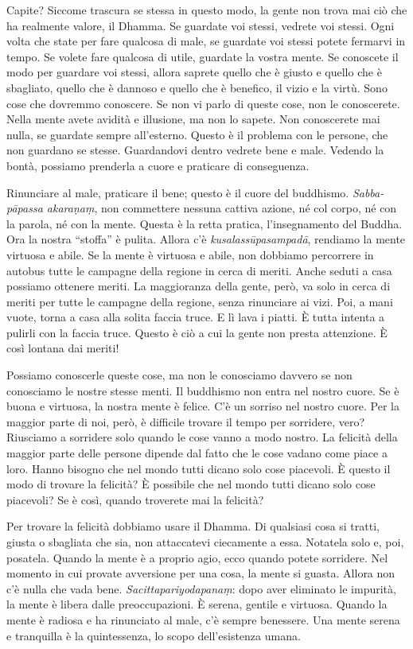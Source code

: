 Capite? Siccome trascura se stessa in questo modo, la gente non trova
mai ciò che ha realmente valore, il Dhamma. Se guardate voi stessi,
vedrete voi stessi. Ogni volta che state per fare qualcosa di male, se
guardate voi stessi potete fermarvi in tempo. Se volete fare qualcosa di
utile, guardate la vostra mente. Se conoscete il modo per guardare voi
stessi, allora saprete quello che è giusto e quello che è sbagliato,
quello che è dannoso e quello che è benefico, il vizio e la virtù. Sono
cose che dovremmo conoscere. Se non vi parlo di queste cose, non le
conoscerete. Nella mente avete avidità e illusione, ma non lo sapete.
Non conoscerete mai nulla, se guardate sempre all'esterno. Questo è il
problema con le persone, che non guardano se stesse. Guardandovi dentro
vedrete bene e male. Vedendo la bontà, possiamo prenderla a cuore e
praticare di conseguenza.

Rinunciare al male, praticare il bene; questo è il cuore del buddhismo.
\emph{Sabba-pāpassa akaraṇaṃ}, non commettere nessuna cattiva azione, né
col corpo, né con la parola, né con la mente. Questa è la retta pratica,
l'insegnamento del Buddha. Ora la nostra ``stoffa'' è pulita. Allora c'è
\emph{kusalassūpasampadā}, rendiamo la mente virtuosa e abile. Se la
mente è virtuosa e abile, non dobbiamo percorrere in autobus tutte le
campagne della regione in cerca di meriti. Anche seduti a casa possiamo
ottenere meriti. La maggioranza della gente, però, va solo in cerca di
meriti per tutte le campagne della regione, senza rinunciare ai vizi.
Poi, a mani vuote, torna a casa alla solita faccia truce. E lì lava i
piatti. È tutta intenta a pulirli con la faccia truce. Questo è ciò a
cui la gente non presta attenzione. È così lontana dai meriti!

Possiamo conoscerle queste cose, ma non le conosciamo davvero se non
conosciamo le nostre stesse menti. Il buddhismo non entra nel nostro
cuore. Se è buona e virtuosa, la nostra mente è felice. C'è un sorriso
nel nostro cuore. Per la maggior parte di noi, però, è difficile trovare
il tempo per sorridere, vero? Riusciamo a sorridere solo quando le cose
vanno a modo nostro. La felicità della maggior parte delle persone
dipende dal fatto che le cose vadano come piace a loro. Hanno bisogno
che nel mondo tutti dicano solo cose piacevoli. È questo il modo di
trovare la felicità? È possibile che nel mondo tutti dicano solo cose
piacevoli? Se è così, quando troverete mai la felicità?

Per trovare la felicità dobbiamo usare il Dhamma. Di qualsiasi cosa si
tratti, giusta o sbagliata che sia, non attaccatevi ciecamente a essa.
Notatela solo e, poi, posatela. Quando la mente è a proprio agio, ecco
quando potete sorridere. Nel momento in cui provate avversione per una
cosa, la mente si guasta. Allora non c'è nulla che vada bene.
\emph{Sacittapariyodapanaṃ}: dopo aver eliminato le impurità, la mente è
libera dalle preoccupazioni. È serena, gentile e virtuosa. Quando la
mente è radiosa e ha rinunciato al male, c'è sempre benessere. Una mente
serena e tranquilla è la quintessenza, lo scopo dell'esistenza umana.

